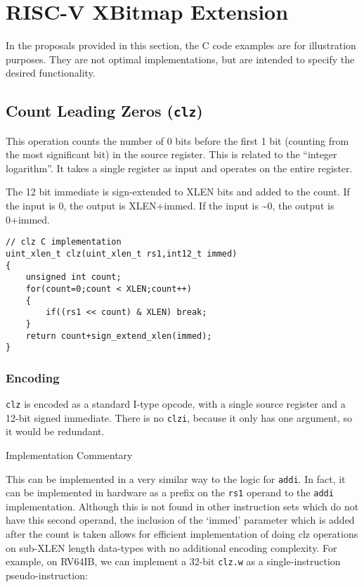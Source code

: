 \chapter{RISC-V XBitmap Extension}\label{risc-v-b-hardware-instructions}

In the proposals provided in this section, the C code examples are for
illustration purposes. They are not optimal implementations, but are
intended to specify the desired functionality.

\section{\texorpdfstring{Count Leading Zeros
(\texttt{clz})}{Count Leading Zeros (clz)}}\label{count-leading-zeros-clz}

This operation counts the number of 0 bits before the first 1 bit
(counting from the most significant bit) in the source register. This is
related to the ``integer logarithm''. It takes a single register as
input and operates on the entire register.

The 12 bit immediate is sign-extended to XLEN bits and added to the
count. If the input is 0, the output is XLEN+immed. If the input is
\textasciitilde{}0, the output is 0+immed.

\begin{verbatim}
// clz C implementation
uint_xlen_t clz(uint_xlen_t rs1,int12_t immed)
{
    unsigned int count;
    for(count=0;count < XLEN;count++)
    {
        if((rs1 << count) & XLEN) break;
    }
    return count+sign_extend_xlen(immed);
}
\end{verbatim}

\subsection{Encoding}\label{encoding}



\texttt{clz} is encoded as a standard I-type opcode, with a single
source register and a 12-bit signed immediate. There is no
\texttt{clzi}, because it only has one argument, so it would be
redundant.

Implementation Commentary

This can be implemented in a very similar way to the logic for
\texttt{addi}. In fact, it can be implemented in hardware as a prefix on
the \texttt{rs1} operand to the \texttt{addi} implementation. Although
this is not found in other instruction sets which do not have this
second operand, the inclusion of the `immed' parameter which is added
after the count is taken allows for efficient implementation of doing
clz operations on sub-XLEN length data-types with no additional encoding
complexity. For example, on RV64IB, we can implement a 32-bit
\texttt{clz.w} as a single-instruction pseudo-instruction:

